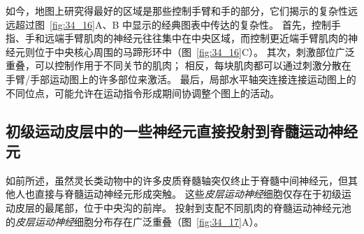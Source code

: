 如今，地图上研究得最好的区域是那些控制手臂和手的部分，它们揭示的复杂性远远超过图~\ref{fig:34_16}A、B 中显示的经典图表中传达的复杂性。
首先，控制手指、手和远端手臂肌肉的神经元往往集中在中央区域，而控制更近端手臂肌肉的神经元则位于中央核心周围的马蹄形环中（图~\ref{fig:34_16}C）。
其次，刺激部位广泛重叠，可以控制作用于不同关节的肌肉；
相反，每块肌肉都可以通过刺激分散在手臂/手部运动图上的许多部位来激活。
最后，局部水平轴突连接连接运动图上的不同位点，可能允许在运动指令形成期间协调整个图上的活动。



\subsection{初级运动皮层中的一些神经元直接投射到脊髓运动神经元}

如前所述，虽然灵长类动物中的许多皮质脊髓轴突仅终止于脊髓中间神经元，但其他人也直接与脊髓运动神经元形成突触。
这些\textit{皮层运动神经}细胞仅存在于初级运动皮层的最尾部，位于中央沟的前岸。
投射到支配不同肌肉的脊髓运动神经元池的\textit{皮层运动神经}细胞分布存在广泛重叠（图~\ref{fig:34_17}A）。


